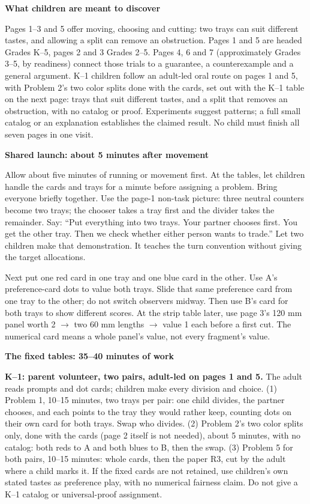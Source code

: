 \documentclass[11pt]{article}
\newcommand{\heading}[1]{\par\vspace{1.5mm}{\large\bfseries #1}\par\vspace{.8mm}}
\newcommand{\subhead}[1]{\par\vspace{1mm}\textbf{#1}\par}
\newcommand{\page}[1]{\newpage\heading{#1}}
\begin{document}
\subhead{What children are meant to discover}
Pages 1--3 and 5 offer moving, choosing and cutting: two trays can suit different tastes, and allowing a split can remove an obstruction. Pages 1 and 5 are headed Grades K--5, pages 2 and 3 Grades 2--5. Pages 4, 6 and 7 (approximately Grades 3--5, by readiness) connect those trials to a guarantee, a counterexample and a general argument. K--1 children follow an adult-led oral route on pages 1 and 5, with Problem 2's two color splits done with the cards, set out with the K--1 table on the next page: trays that suit different tastes, and a split that removes an obstruction, with no catalog or proof. Experiments suggest patterns; a full small catalog or an explanation establishes the claimed result. No child must finish all seven pages in one visit.

\page{Running the hour with three anchored adults}
\subhead{Shared launch: about 5 minutes after movement}
Allow about five minutes of running or movement first. At the tables, let children handle the cards and trays for a minute before assigning a problem. Bring everyone briefly together. Use the page-1 non-task picture: three neutral counters become two trays; the chooser takes a tray first and the divider takes the remainder. Say: ``Put everything into two trays. Your partner chooses first. You get the other tray. Then we check whether either person wants to trade.'' Let two children make that demonstration. It teaches the turn convention without giving the target allocations.

Next put one red card in one tray and one blue card in the other. Use A's preference-card dots to value both trays. Slide that same preference card from one tray to the other; do not switch observers midway. Then use B's card for both trays to show different scores. At the strip table later, use page 3's 120 mm panel worth 2 $\to$ two 60 mm lengths $\to$ value 1 each before a first cut. The numerical card means a whole panel's value, not every fragment's value.

\subhead{The fixed tables: 35--40 minutes of work}
\textbf{K--1: parent volunteer, two pairs, adult-led on pages 1 and 5.} The adult reads prompts and dot cards; children make every division and choice. (1) Problem 1, 10--15 minutes, two trays per pair: one child divides, the partner chooses, and each points to the tray they would rather keep, counting dots on their own card for both trays. Swap who divides. (2) Problem 2's two color splits only, done with the cards (page 2 itself is not needed), about 5 minutes, with no catalog: both reds to A and both blues to B, then the swap. (3) Problem 5 for both pairs, 10--15 minutes: whole cards, then the paper R3, cut by the adult where a child marks it. If the fixed cards are not retained, use children's own stated tastes as preference play, with no numerical fairness claim. Do not give a K--1 catalog or universal-proof assignment.
\end{document}
